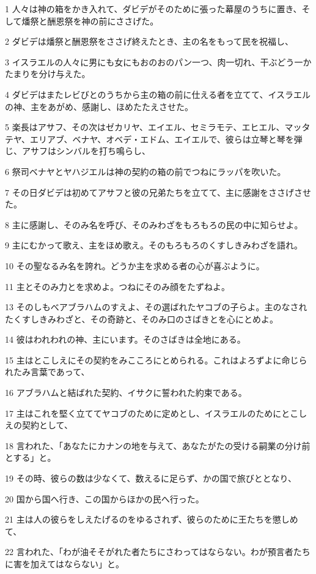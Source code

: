 \par 1 人々は神の箱をかき入れて、ダビデがそのために張った幕屋のうちに置き、そして燔祭と酬恩祭を神の前にささげた。
\par 2 ダビデは燔祭と酬恩祭をささげ終えたとき、主の名をもって民を祝福し、
\par 3 イスラエルの人々に男にも女にもおのおのパン一つ、肉一切れ、干ぶどう一かたまりを分け与えた。
\par 4 ダビデはまたレビびとのうちから主の箱の前に仕える者を立てて、イスラエルの神、主をあがめ、感謝し、ほめたたえさせた。
\par 5 楽長はアサフ、その次はゼカリヤ、エイエル、セミラモテ、エヒエル、マッタテヤ、エリアブ、ベナヤ、オベデ・エドム、エイエルで、彼らは立琴と琴を弾じ、アサフはシンバルを打ち鳴らし、
\par 6 祭司ベナヤとヤハジエルは神の契約の箱の前でつねにラッパを吹いた。
\par 7 その日ダビデは初めてアサフと彼の兄弟たちを立てて、主に感謝をささげさせた。
\par 8 主に感謝し、そのみ名を呼び、そのみわざをもろもろの民の中に知らせよ。
\par 9 主にむかって歌え、主をほめ歌え。そのもろもろのくすしきみわざを語れ。
\par 10 その聖なるみ名を誇れ。どうか主を求める者の心が喜ぶように。
\par 11 主とそのみ力とを求めよ。つねにそのみ顔をたずねよ。
\par 13 そのしもべアブラハムのすえよ、その選ばれたヤコブの子らよ。主のなされたくすしきみわざと、その奇跡と、そのみ口のさばきとを心にとめよ。
\par 14 彼はわれわれの神、主にいます。そのさばきは全地にある。
\par 15 主はとこしえにその契約をみこころにとめられる。これはよろずよに命じられたみ言葉であって、
\par 16 アブラハムと結ばれた契約、イサクに誓われた約束である。
\par 17 主はこれを堅く立ててヤコブのために定めとし、イスラエルのためにとこしえの契約として、
\par 18 言われた、「あなたにカナンの地を与えて、あなたがたの受ける嗣業の分け前とする」と。
\par 19 その時、彼らの数は少なくて、数えるに足らず、かの国で旅びととなり、
\par 20 国から国へ行き、この国からほかの民へ行った。
\par 21 主は人の彼らをしえたげるのをゆるされず、彼らのために王たちを懲しめて、
\par 22 言われた、「わが油そそがれた者たちにさわってはならない。わが預言者たちに害を加えてはならない」と。
